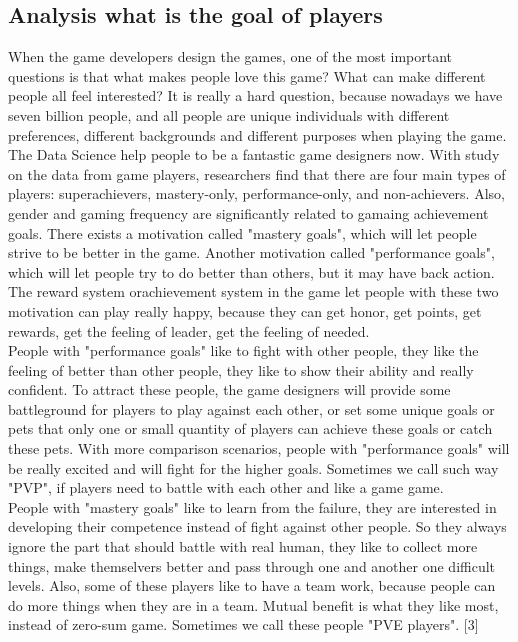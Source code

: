 \documentclass[12pt]{article}
\begin{document}
        \subsection{Analysis what is the goal of players}
            When the game developers design the games, one of the most important questions is that
            what makes people love this game? What can make different people all feel interested? It
            is really a hard question, because nowadays we have seven billion people, and all people are
            unique individuals with different preferences, different backgrounds and different purposes
            when playing the game. The Data Science help people to be a fantastic game designers now.
            With study on the data from game players, researchers find that there are four main types
            of players: superachievers, mastery-only, performance-only, and non-achievers. Also,
            gender and gaming frequency are significantly related to gamaing achievement goals.
            There exists a motivation called "mastery goals", which will let people strive to be
            better in the game. Another motivation called "performance goals", which will let people
            try to do better than others, but it may have back action. The reward system orachievement
            system in the game let people with these two motivation can play really happy, because
            they can get honor, get points, get rewards, get the feeling of leader, get the feeling
            of needed.\\

            People with "performance goals" like to fight with other people, they like the feeling
            of better than other people, they like to show their ability and really confident. To
            attract these people, the game designers will provide some battleground for players to
            play against each other, or set some unique goals or pets that only one or small quantity
            of players can achieve these goals or catch these pets. With more comparison scenarios,
            people with "performance goals" will be really excited and will fight for the higher goals.
            Sometimes we call such way "PVP", if players need to battle with each other and like a
            game game.\\

            People with "mastery goals" like to learn from the failure, they are interested in
            developing their competence instead of fight against other people. So they always ignore
            the part that should battle with real human, they like to collect more things, make
            themselvers better and pass through one and another one difficult levels. Also, some of
            these players like to have a team work, because people can do more things when they are
            in a team. Mutual benefit is what they like most, instead of zero-sum game. Sometimes we
            call these people "PVE players".
            [3]
\end{document}
